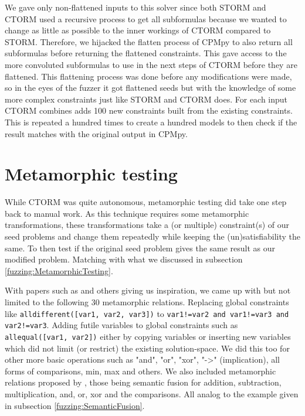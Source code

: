We gave only non-flattened inputs to this solver since both STORM and CTORM used a recursive process to get all subformulas because we wanted to change as little as possible to the inner workings of CTORM compared to STORM. Therefore, we hijacked the flatten process of CPMpy to also return all subformulas before returning the flattened constraints. This gave access to the more convoluted subformulas to use in the next steps of CTORM before they are flattened. This flattening process was done before any modifications were made, so in the eyes of the fuzzer it got flattened seeds but with the knowledge of some more complex constraints just like STORM and CTORM does. For each input CTORM combines adds 100 new constraints built from the existing constraints. This is repeated a hundred times to create a hundred models to then check if the result matches with the original output in CPMpy.

%


\section{Metamorphic testing}
\label{impl:Meta}
While CTORM was quite autonomous, metamorphic testing did take one step back to manual work. As this technique requires some metamorphic transformations, these transformations take a (or multiple) constraint(s) of our seed problems and change them repeatedly while keeping the (un)satisfiability the same. To then test if the original seed problem gives the same result as our modified problem. Matching with what we discussed in subsection \ref{fuzzing:MetamorphicTesting}. 

With papers such as \cite{50akgun2018metamorphic, 49usman2020testmc, 43YinYang} and others giving us inspiration, we came up with but not limited to the following 30 metamorphic relations. Replacing global constraints like \texttt{alldifferent([var1, var2, var3])} to \texttt{var1!=var2 and var1!=var3 and var2!=var3}. Adding futile variables to global constraints such as \texttt{allequal([var1, var2])} either by copying variables or inserting new variables which did not limit (or restrict) the existing solution-space. We did this too for other more basic operations such as "and", "or", "xor", "->" (implication), all forms of comparisons, min, max and others. We also included metamorphic relations proposed by \cite{43YinYang}, those being semantic fusion for addition, subtraction, multiplication, and, or, xor and the comparisons. All analog to the example given in subsection \ref{fuzzing:SemanticFusion}. 

